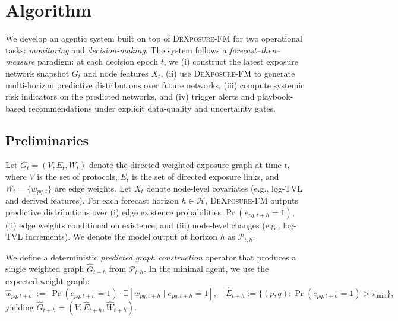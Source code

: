 \section{Algorithm}
\label{sec:algorithm}

We develop an agentic system built on top of \textsc{DeXposure-FM} for two operational tasks: \emph{monitoring} and \emph{decision-making}. The system follows a \emph{forecast--then--measure} paradigm: at each decision epoch $t$, we (i) construct the latest exposure network snapshot $G_t$ and node features $X_t$, (ii) use \textsc{DeXposure-FM} to generate multi-horizon predictive distributions over future networks, (iii) compute systemic risk indicators on the predicted networks, and (iv) trigger alerts and playbook-based recommendations under explicit data-quality and uncertainty gates.

\subsection{Preliminaries}
Let $G_t=(V,E_t,W_t)$ denote the directed weighted exposure graph at time $t$, where $V$ is the set of protocols, $E_t$ is the set of directed exposure links, and $W_t=\{w_{pq,t}\}$ are edge weights. Let $X_t$ denote node-level covariates (e.g., log-TVL and derived features). For each forecast horizon $h \in \mathcal{H}$, \textsc{DeXposure-FM} outputs predictive distributions over (i) edge existence probabilities $\Pr(e_{pq,t+h}=1)$, (ii) edge weights conditional on existence, and (iii) node-level changes (e.g., log-TVL increments). We denote the model output at horizon $h$ as $\mathcal{P}_{t,h}$.

We define a deterministic \emph{predicted graph construction} operator that produces a single weighted graph $\widehat{G}_{t+h}$ from $\mathcal{P}_{t,h}$. In the minimal agent, we use the expected-weight graph:
\begin{equation}
\label{eq:expected_graph}
\widehat{w}_{pq,t+h}
~:=~
\Pr(e_{pq,t+h}=1)\cdot \mathbb{E}\!\left[w_{pq,t+h}\mid e_{pq,t+h}=1\right],
\quad
\widehat{E}_{t+h}:=\{(p,q): \Pr(e_{pq,t+h}=1)>\pi_{\min}\},
\end{equation}
yielding $\widehat{G}_{t+h}=(V,\widehat{E}_{t+h},\widehat{W}_{t+h})$.

